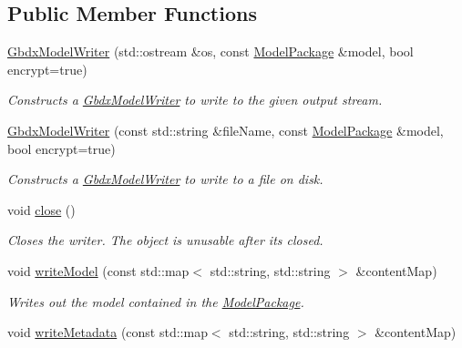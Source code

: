 \subsection*{Public Member Functions}
\begin{DoxyCompactItemize}
\item 
\hyperlink{group___classification_module_ga783393c4251282622db262338581da20}{Gbdx\+Model\+Writer} (std\+::ostream \&os, const \hyperlink{classdg_1_1deepcore_1_1classification_1_1_model_package}{Model\+Package} \&model, bool encrypt=true)
\begin{DoxyCompactList}\small\item\em Constructs a \hyperlink{classdg_1_1deepcore_1_1classification_1_1_gbdx_model_writer}{Gbdx\+Model\+Writer} to write to the given output stream. \end{DoxyCompactList}\item 
\hyperlink{group___classification_module_ga6806ebdaff05b3ff528a9c0fff8fe494}{Gbdx\+Model\+Writer} (const std\+::string \&file\+Name, const \hyperlink{classdg_1_1deepcore_1_1classification_1_1_model_package}{Model\+Package} \&model, bool encrypt=true)
\begin{DoxyCompactList}\small\item\em Constructs a \hyperlink{classdg_1_1deepcore_1_1classification_1_1_gbdx_model_writer}{Gbdx\+Model\+Writer} to write to a file on disk. \end{DoxyCompactList}\item 
void \hyperlink{group___classification_module_gabb8c5d415c526a83a3c4e9222bfada9b}{close} ()
\begin{DoxyCompactList}\small\item\em Closes the writer. The object is unusable after it\textquotesingle{}s closed. \end{DoxyCompactList}\item 
void \hyperlink{group___classification_module_gaddc807cb470f47457237613199395f54}{write\+Model} (const std\+::map$<$ std\+::string, std\+::string $>$ \&content\+Map)
\begin{DoxyCompactList}\small\item\em Writes out the model contained in the \hyperlink{classdg_1_1deepcore_1_1classification_1_1_model_package}{Model\+Package}. \end{DoxyCompactList}\item 
void \hyperlink{group___classification_module_gaf870ec5ffa5611fbc185a31964180c25}{write\+Metadata} (const std\+::map$<$ std\+::string, std\+::string $>$ \&content\+Map)

\end{DoxyCompactItemize}
